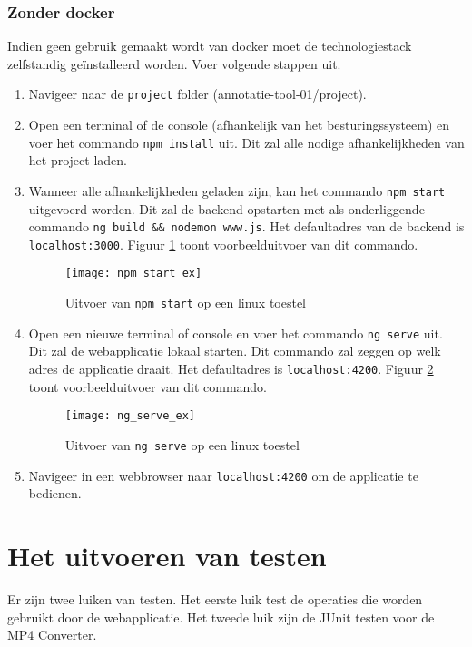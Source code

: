 \subsubsection{Zonder docker}
Indien geen gebruik gemaakt wordt van docker moet de technologiestack 
zelfstandig ge\"installeerd worden. Voer volgende stappen uit.
\begin{enumerate}
	\item Navigeer naar de \texttt{project} folder (annotatie-tool-01/project).
	\item Open een terminal of de console (afhankelijk van het besturingssysteem) 
	      en voer het commando \texttt{npm install} uit. Dit zal alle nodige 
	      afhankelijkheden van het project laden.
	\item Wanneer alle afhankelijkheden geladen zijn, kan het commando \texttt{npm 
	start} uitgevoerd worden. Dit zal de backend opstarten met als onderliggende 
	commando \texttt{ng build \&\& nodemon www.js}. Het defaultadres van de backend 
	is \texttt{localhost:3000}. Figuur \ref{fig:npm_start_ex} toont 
	voorbeelduitvoer van dit commando.
	\begin{figure}[ht]

		\texttt{[image: npm\_start\_ex]}  		
		\caption{Uitvoer van \texttt{npm start} op een linux toestel}
		\label{fig:npm_start_ex}
	\end{figure}
	
	\item Open een nieuwe terminal of console en voer het commando \texttt{ng 
	serve} uit. Dit zal de webapplicatie lokaal starten. Dit commando zal zeggen op 
	welk adres de applicatie draait. Het defaultadres is \texttt{localhost:4200}. 
	Figuur \ref{fig:ng_serve_ex} toont voorbeelduitvoer van dit commando.
	\begin{figure}[ht]
		\texttt{[image: ng\_serve\_ex]}  
		
		\caption{Uitvoer van \texttt{ng serve} op een linux toestel}
		\label{fig:ng_serve_ex}
	\end{figure}
	
	
	\item Navigeer in een webbrowser naar \texttt{localhost:4200} om de 
	      applicatie te bedienen.
\end{enumerate}



    
\section{Het uitvoeren van testen}
\label{sec:test_exec}
Er zijn twee luiken van testen. Het eerste luik test de operaties die 
worden gebruikt door de webapplicatie. Het tweede luik zijn de JUnit testen voor 
de MP4 Converter.
    
